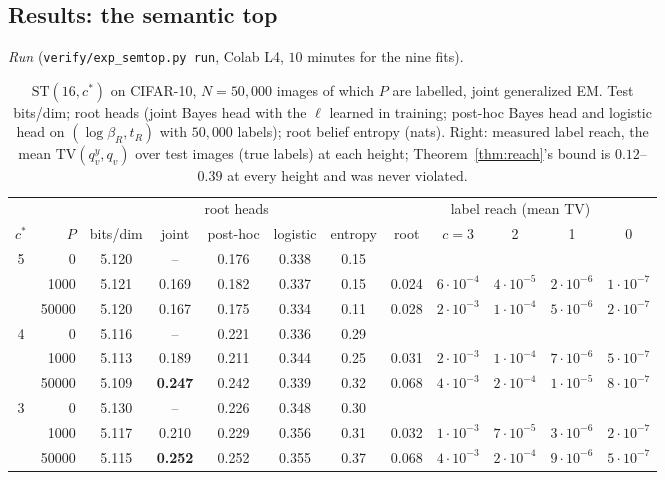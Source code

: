 \documentclass[11pt]{article}
\theoremstyle{definition}
\begin{document}
\subsection{Results: the semantic top}\label{sec:semtop-res}
\emph{Run} (\texttt{verify/exp\_semtop.py run}, Colab L4, $10$ minutes for the nine fits).

\begin{table}[h]\centering
\caption{$\mathrm{ST}(16,c^*)$ on CIFAR-10, $N=50{,}000$ images of which $P$ are labelled, joint generalized EM. Test
bits/dim; root heads (joint Bayes head with the $\ell$ learned in training; post-hoc Bayes head and logistic head on
$(\log\beta_R,t_R)$ with $50{,}000$ labels); root belief entropy (nats). Right: measured label reach, the mean
$\mathrm{TV}(q^y_v,q_v)$ over test images (true labels) at each height; Theorem~\ref{thm:reach}'s bound is $0.12$--$0.39$
at every height and was never violated.}\label{tab:semtop}
\small\begin{tabular}{cr|c|ccc|c|ccccc}\toprule
& & & \multicolumn{3}{c|}{root heads} & & \multicolumn{5}{c}{label reach (mean TV)}\\
$c^*$ & $P$ & bits/dim & joint & post-hoc & logistic & entropy & root & $c{=}3$ & 2 & 1 & 0\\\midrule
5 & 0 & 5.120 & -- & 0.176 & 0.338 & 0.15 & & & & &\\
& 1000 & 5.121 & 0.169 & 0.182 & 0.337 & 0.15 & 0.024 & $6\cdot10^{-4}$ & $4\cdot10^{-5}$ & $2\cdot10^{-6}$ & $1\cdot10^{-7}$\\
& 50000 & 5.120 & 0.167 & 0.175 & 0.334 & 0.11 & 0.028 & $2\cdot10^{-3}$ & $1\cdot10^{-4}$ & $5\cdot10^{-6}$ & $2\cdot10^{-7}$\\\midrule
4 & 0 & 5.116 & -- & 0.221 & 0.336 & 0.29 & & & & &\\
& 1000 & 5.113 & 0.189 & 0.211 & 0.344 & 0.25 & 0.031 & $2\cdot10^{-3}$ & $1\cdot10^{-4}$ & $7\cdot10^{-6}$ & $5\cdot10^{-7}$\\
& 50000 & 5.109 & \textbf{0.247} & 0.242 & 0.339 & 0.32 & 0.068 & $4\cdot10^{-3}$ & $2\cdot10^{-4}$ & $1\cdot10^{-5}$ & $8\cdot10^{-7}$\\\midrule
3 & 0 & 5.130 & -- & 0.226 & 0.348 & 0.30 & & & & &\\
& 1000 & 5.117 & 0.210 & 0.229 & 0.356 & 0.31 & 0.032 & $1\cdot10^{-3}$ & $7\cdot10^{-5}$ & $3\cdot10^{-6}$ & $2\cdot10^{-7}$\\
& 50000 & 5.115 & \textbf{0.252} & 0.252 & 0.355 & 0.37 & 0.068 & $4\cdot10^{-3}$ & $2\cdot10^{-4}$ & $9\cdot10^{-6}$ & $5\cdot10^{-7}$\\
\bottomrule\end{tabular}
\end{table}
\end{document}
